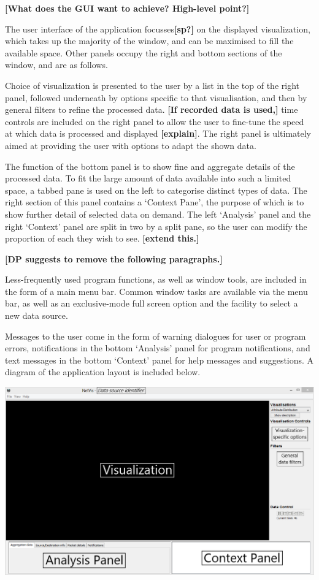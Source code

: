 \textbf{[What does the GUI want to achieve? High-level point?]}

The user interface of the application focusses\textbf{[sp?]} on the displayed
visualization, which takes up the majority of the window, and can be maximised
to fill the available space. Other panels occupy the right and bottom sections
of the window, and are as follows.

Choice of visualization is presented to the user by a list in the top of the
right panel, followed underneath by options specific to that visualisation, and
then by general filters to refine the processed data. \textbf{[If recorded data is used,]} time controls are
included on the right panel to allow the user to fine-tune the speed at which
data is processed and displayed \textbf{[explain]}. The right panel is ultimately aimed at
providing the user with options to adapt the shown data.

The function of the bottom panel is to show fine and aggregate details of the
processed data. To fit the large amount of data available into such a limited
space, a tabbed pane is used on the left to categorise distinct types of data.
The right section of this panel contains a `Context Pane', the purpose of
which is to show further detail of selected data on demand. The left
`Analysis' panel and the right `Context' panel are split in two by a split
pane, so the user can modify the proportion of each they wish to see. \textbf{[extend this.]}

\textbf{[DP suggests to remove the following paragraphs.]}

Less-frequently used program functions, as well as window tools, are included
in the form of a main menu bar. Common window tasks are available via the menu
bar, as well as an exclusive-mode full screen option and the facility to select
a new data source.

Messages to the user come in the form of warning dialogues for user or program
errors, notifications in the bottom `Analysis' panel for program notifications,
and text messages in the bottom `Context' panel for help messages and
suggestions. A diagram of the application layout is included below.

\includegraphics[width=\linewidth]{materials/layout-diagram.png}
